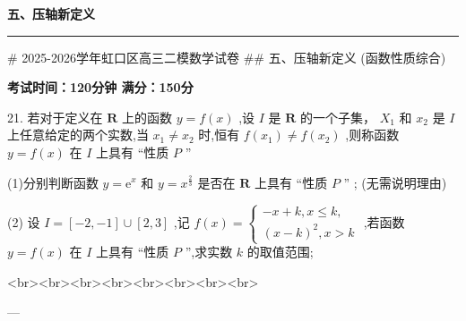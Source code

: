 \documentclass[11pt,a4paper]{article}
\renewcommand{\leq}{\leqslant}
\begin{document}
{\centering\Large\bfseries 五、压轴新定义\par}
\vspace{0.3em}
\hrule
\vspace{0.5em}

# 2025-2026学年虹口区高三二模数学试卷
## 五、压轴新定义
(函数性质综合)


\textbf{考试时间：120分钟  满分：150分}


21. 若对于定义在 $\mathbf{R}$ 上的函数 $y = f\left( x\right)$ ,设 $I$ 是 $\mathbf{R}$ 的一个子集， ${X}_{1}$ 和 ${x}_{2}$ 是 $I$ 上任意给定的两个实数,当 ${x}_{1} \neq  {x}_{2}$ 时,恒有 $f\left( {x}_{1}\right)  \neq  f\left( {x}_{2}\right)$ ,则称函数 $y = f\left( x\right)$ 在 $I$ 上具有 “性质 $P$ ”

(1)分别判断函数 $y = {\mathrm{e}}^{x}$ 和 $y = {x}^{\frac{2}{3}}$ 是否在 $\mathbf{R}$ 上具有 “性质 $P$ ” ; (无需说明理由)

(2) 设 $I = \left\lbrack  {-2, - 1}\right\rbrack   \cup  \left\lbrack  {2,3}\right\rbrack$ ,记 $f\left( x\right)  = \left\{  \begin{array}{l}  - x + k, x \leq  k, \\  {\left( x - k\right) }^{2}, x > k \end{array}\right.$ ,若函数 $y = f\left( x\right)$ 在 $I$ 上具有 “性质 $P$ ”,求实数 $k$ 的取值范围;




<br><br><br><br><br><br><br><br>


---
\end{document}
